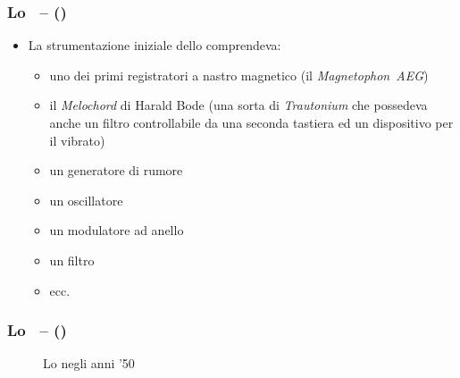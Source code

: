 \begin{frame}
    \frametitle{Lo \sem\ -- ()}

    \begin{itemize}

        \item La strumentazione iniziale dello \sem comprendeva:

        \begin{itemize}

            \item uno dei primi registratori a nastro magnetico (il \emph{Magnetophon\ AEG})

            \item il \emph{Melochord} di Harald Bode (una sorta di \emph{Trautonium}
                che possedeva anche un filtro controllabile da una seconda tastiera
                ed un dispositivo per il vibrato)

            \item un generatore di rumore

            \item un oscillatore

            \item un modulatore ad anello

            \item un filtro

            \item ecc.

        \end{itemize}

    \end{itemize}

\end{frame}

\begin{frame}
    \frametitle{Lo \sem\ -- ()}

    \begin{center}
        \begin{figure}
            \caption{Lo \sem negli anni '50}
        \end{figure}
    \end{center}

\end{frame}


